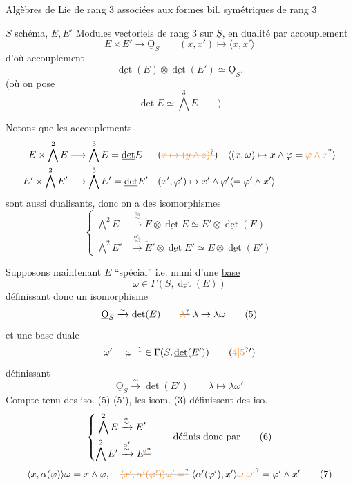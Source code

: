 
Algèbres de Lie de rang 3 associées aux formes bil. symétriques de rang 3


$S$ schéma, $E,E'$ Modules vectoriels de rang 3 sur $\underline S$, en dualité par accouplement
\[
 E\times E'\longrightarrow\underline{\mathrm O}_S\qquad (x,x')\longmapsto\langle x,x'\rangle \tag*{(1)}
\]
d'où accouplement
\[
 \underline{\det}(E)\otimes\underline{\det}(E')\simeq\underline{\mathrm O}_S. \tag*{(2)}
\]
(où on pose
\[
 \underline{\det} E\simeq\bigwedge^3 E\qquad )
\]

Notons que les accouplements
\[
\begin{aligned}
 E\times\bigwedge^2 E&\longrightarrow\bigwedge^3 E=\underline{\det} E
 &&(\deleted{\unsure{x\mapsto(y\wedge z)}})\quad
 \inserted{(x,\omega)\mapsto x\wedge\varphi=\unsure{\varphi\wedge x}}\\
 E'\times\bigwedge^2 E'&\longrightarrow\bigwedge^3 E'=\underline{\det} E'
 &&(x',\varphi')\mapsto x'\wedge\varphi'\inserted{=\varphi'\wedge x'}
\end{aligned}
\]
sont aussi dualisants, donc on a des isomorphismes
\[
\left\{\begin{aligned}
 \bigwedge^2 E&\xrightarrow{\overset{\alpha_0}{\sim}}\check E\otimes\underline{\det} E\simeq E'\otimes\underline{\det}(E)\\
 \bigwedge^2 E'&\xrightarrow{\overset{\alpha'_0}{\sim}}\check E'\otimes\underline{\det} E'\simeq E\otimes\underline{\det}(E')
\end{aligned}\right. \tag*{(3)}
\]

Supposons maintenant $E$ ``spécial'' i.e. muni d'une \uline{base}
\[
 \omega\in\Gamma(S,\underline{\det}(E)) \tag*{(4)}
\]
définissant donc un isomorphisme
\[
 \underline{\mathrm O}_S\xrightarrow{\sim}\det(E)\qquad
 \deleted{\unsure{\lambda}}\ \lambda\mapsto\lambda\omega \tag*{(5)}
\]
et une base duale
\[
 \omega'=\omega^{-1}\in\Gamma(S,\underline{\det}(E')) \tag*{(\unsure{4|5}$'$)}
\]
définissant
\[
 \underline{\mathrm O}_S\xrightarrow{\sim}\det(E')\qquad\lambda\mapsto\lambda\omega' \tag*{(5$'$)}
\]
Compte tenu des iso. (5) (5$'$), les isom. (3) définissent des iso.
\[
\left\{\begin{aligned}
 \bigwedge^2 E&\xrightarrow{\overset{\alpha}{\sim}}E'\\
 \bigwedge^2 E'&\xrightarrow{\overset{\alpha'}{\sim}}E\deleted{\unsure{'}}
\end{aligned}\right.\qquad\text{définis donc par} \tag*{(6)}
\]
\[
 \langle x,\alpha(\varphi)\rangle\omega=x\wedge\varphi,\quad
 \deleted{\unsure{\langle x',\alpha'(\varphi')\rangle\omega'=}}\;
 \langle\alpha'(\varphi'),x'\rangle\unsure{\omega|\omega'}=\varphi'\wedge x' \tag*{(7)}
\]

